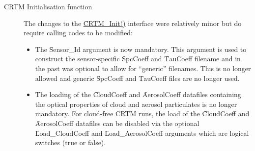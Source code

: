 \begin{description}
\item[CRTM Initialisation function] The changes to the \hyperref[sec:CRTM_Init_interface]{\f{CRTM\_Init()}} interface were relatively minor but do require calling codes to be modified:
  \begin{itemize}
  \item The \f{Sensor\_Id} argument is now mandatory. This argument is used to construct the sensor-specific \f{SpcCoeff} and \f{TauCoeff} filename and in the past was optional to allow for ``generic'' filenames. This is no longer allowed and generic \f{SpcCoeff} and \f{TauCoeff} files are no longer used.
  \item The loading of the \f{CloudCoeff} and \f{AerosolCoeff} datafiles containing the optical properties of cloud and aerosol particulates is no longer mandatory. For cloud-free CRTM runs, the load of the \f{CloudCoeff} and \f{AerosolCoeff} datafiles can be disabled via the optional \f{Load\_CloudCoeff} and \f{Load\_AerosolCoeff} arguments which are logical switches (true or false).
  \end{itemize}


\end{description}
